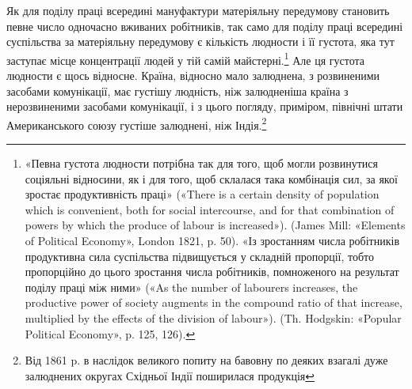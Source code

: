 Як для поділу праці всередині мануфактури матеріяльну передумову
становить певне число одночасно вживаних робітників,
так само для поділу праці всередині суспільства за матеріяльну
передумову є кількість людности і її густота, яка тут заступає
місце концентрації людей у тій самій майстерні.\footnote{
«Певна густота людности потрібна так для того, щоб могли розвинутися
соціяльні відносини, як і для того, щоб склалася така комбінація
сил, за якої зростає продуктивність праці» («There is a certain
density of population which is convenient, both for social intercourse,
and for that combination of powers by which the produce of labour is increased»).
(James Mill: «Elements of Political Economy», London 1821,
p. 50). «Із зростанням числа робітників продуктивна сила суспільства
підвищується у складній пропорції, тобто пропорційно до цього зростання
числа робітників, помноженого на результат поділу праці між ними»
(«As the number of labourers increases, the productive power of society
augments in the compound ratio of that increase, multiplied by the
effects of the division of labour»). (Th. Hodgskin: «Popular Political Economy»,
p. 125, 126).
} Але ця густота
людности є щось відносне. Країна, відносно мало залюднена,
з розвиненими засобами комунікації, має густішу людність, ніж
залюдненіша країна з нерозвиненими засобами комунікації, і з
цього погляду, приміром, північні штати Американського союзу
густіше залюднені, ніж Індія.\footnote{
Від 1861 p. в наслідок великого попиту на бавовну по деяких
взагалі дуже залюднених округах Східньої Індії поширилася продукція
}

